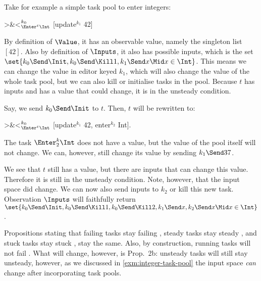 \begin{example}
  \label{exm:integer-task-pool}
  Take for example a simple task pool to enter integers:
  \begin{TASK}
    >&<$_{\Enter^\epsilon \Int}^{k_0}$ [update$^{k_1}$ 42]
  \end{TASK}

  By definition of $\Value$, it has an observable value, namely the singleton list $[42]$.
  Also by definition of $\Inputs$, it also has possible inputs,
  which is the set $\set{k_0\Send\Init, k_0\Send\Kill1, k_1\Send x \Mid x\in\Int}$.
  This means we can change the value in editor keyed $k_1$,
  which will also change the value of the whole task pool,
  but we can also kill or initialise tasks in the pool.
  Because $t$ has inputs and has a value that could change,
  it is in the unsteady condition.

  Say, we send $k_0\Send\Init$ to $t$.
  Then, $t$ will be rewritten to:
  \begin{TASK}
    >&<$_{\Enter^\epsilon \Int}^{k_0}$ [update$^{k_1}$ 42, enter$^{k_2}$ Int].
  \end{TASK}
  The task $\Enter^k_2\Int$ does not have a value,
  but the value of the pool itself will not change.
  We can, however, still change its value by sending $k_1\Send37$.

  We see that $t$ still has a value,
  but there are inputs that can change this value.
  Therefore it is still in the unsteady condition.
  Note, however, that the input space did change.
  We can now also send inputs to $k_2$ or kill this new task.
  Observation $\Inputs$ will faithfully return
  $\set{k_0\Send\Init, k_0\Send\Kill1, k_0\Send\Kill2, k_1\Send x, k_2\Send x \Mid x\in\Int}$.
\end{example}

Propositions stating that failing tasks stay failing ,
steady tasks stay steady ,
and stuck tasks stay stuck ,
stay the same.
Also, by construction, running tasks will not fail .
What will change, however, is Prop.~2b:
unsteady tasks will still stay unsteady,
however, as we discussed in \cref{exm:integer-task-pool} the input space \emph{can} change after incorporating task pools.
